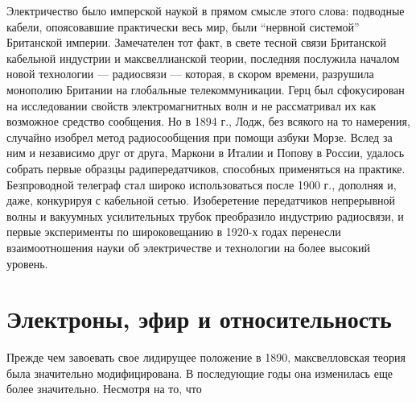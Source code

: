 \documentclass[12pt, oneside, a4paper]{article}
\begin{document}
Электричество было имперской наукой в прямом смысле этого слова: подводные кабели, опоясовавшие практически весь мир, были ``нервной системой'' Британской империи. Замечателен тот факт, в свете тесной связи Британской кабельной индустрии и максвеллианской теории, последняя послужила началом новой технологии --- радиосвязи --- которая, в скором времени, разрушила монополию Британии на глобальные телекоммуникации. Герц был сфокусирован на исследовании свойств электромагнитных волн и не рассматривал их как возможное средство сообщения.  Но в 1894 г., Лодж, без всякого на то намерения, случайно изобрел метод радиосообщения при помощи азбуки Морзе. Вслед за ним и независимо друг от друга, Маркони в Италии и Попову в России, удалось собрать первые образцы радипередатчиков, способных применяться на практике. Безпроводной телеграф стал широко использоваться после 1900 г., дополняя и, даже, конкурируя с кабельной сетью. Изоберетение передатчиков непрерывной волны и вакуумных усилительных трубок преобразило индустрию радиосвязи, и первые эксперименты по широковещанию в 1920-х годах перенесли взаимоотношения науки об электричестве и технологии на более высокий уровень.
\section*{Электроны, эфир и относительность}
Прежде чем завоевать свое лидирущее положение в 1890, максвелловская теория была значительно модифицирована. В последующие годы она изменилась еще более значительно. Несмотря на то, что 
\end{document}
